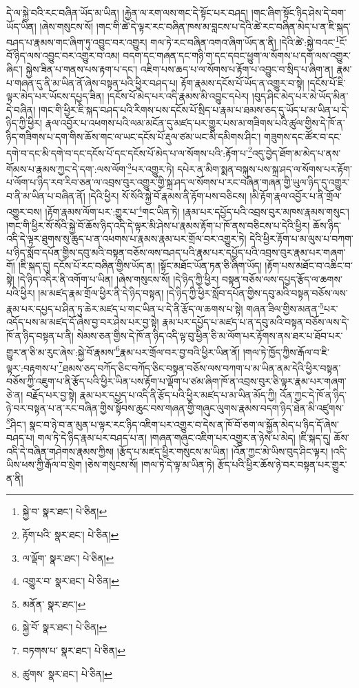 དེ་ལ་སྐྱེ་བའི་རང་བཞིན་ཡོད་མ་ཡིན། །རྐྱེན་ལ་རག་ལས་གང་དེ་སྟོང་པར་བཤད། །གང་ཞིག་སྟོང་ཉིད་ཤེས་དེ་བག་ཡོད་ཡིན། །ཞེས་གསུངས་སོ། །གང་གི་ཚེ་དེ་ལྟར་རང་བཞིན་ཁས་མ་བླངས་པ་དེའི་ཚེ་རང་བཞིན་མེད་པ་ན་ཇི་སྐད་བཤད་པ་རྣམས་གང་ཞིག་ཏུ་འབྱུང་བར་འགྱུར། གལ་ཏེ་རང་བཞིན་འགའ་ཞིག་ཡོད་ན་ནི། །དེའི་ཚེ་:སྐྱེ་བའང་\footnote{སྐྱེ་བ་  སྣར་ཐང་།  པེ་ཅིན། }ངོ་བོ་ཉིད་ལས་འབྱུང་བར་འགྱུར་བ་འམ། བདག་དང་གཞན་དང་གཉི་ག་དང་དབང་ཕྱུག་ལ་སོགས་པ་དག་ལས་འགྱུར་ཞིང་། སྐྱེས་ཟིན་པ་གནས་པས་རྟག་པ་དང་། འཇིག་པས་ཆད་པ་ལ་སོགས་པ་རྟོག་པ་འབྱུང་བ་སྲིད་པ་ཞིག་ན། རྣམ་པ་གཞན་དུ་ནི་མ་ཡིན་ནོ་ཞེས་བསྟན་པའི་ཕྱིར་བཤད་པ། རྟོག་རྣམས་དངོས་པོ་ཡོད་ན་འགྱུར་བ་སྟེ། །དངོས་པོ་ཇི་ལྟར་མེད་པར་ཡོངས་དཔྱད་ཟིན། །དངོས་པོ་མེད་པར་འདི་རྣམས་མི་འབྱུང་དཔེར། །བུད་ཤིང་མེད་པར་མེ་ཡོད་མིན་དེ་བཞིན། །གང་གི་ཕྱིར་ཇི་སྐད་བཤད་པའི་རིགས་པས་དངོས་པོ་སྲིད་པ་རྣམ་པ་ཐམས་ཅད་དུ་ཡོད་པ་མ་ཡིན་པ་དེ་ཉིད་ཀྱི་ཕྱིར། རྣལ་འབྱོར་པ་འཕགས་པའི་ལམ་མངོན་དུ་མཛད་པར་གྱུར་པས་མ་གཟིགས་པའི་ཚུལ་གྱིས་དེ་ཁོ་ན་ཉིད་གཟིགས་པ་དག་གིས་ཆོས་གང་ལ་ཡང་དངོས་པོ་རྡུལ་ཙམ་ཡང་མི་དམིགས་ཤིང་། གཟུགས་དང་ཚོར་བ་དང་དགེ་བ་དང་མི་དགེ་བ་དང་དངོས་པོ་དང་དངོས་པོ་མེད་པ་ལ་སོགས་པའི་:རྟོག་པ་\footnote{རྟོག་པའི་  སྣར་ཐང་།  པེ་ཅིན། }འདུ་བྱེད་ཐོག་མ་མེད་པ་ནས་གོམས་པ་རྣམས་ཀྱང་དེ་དག་:ལས་ལོག་\footnote{ལ་ལྡོག་  སྣར་ཐང་།  པེ་ཅིན། }པར་འགྱུར་ཏེ། དཔེར་ན་མིག་སྨན་བསྐུས་པས་སྐྲ་ཤད་ལ་སོགས་པར་རྟོག་པ་ལོག་པ་ཉིད་རབ་རིབ་ཅན་ལ་འབྲས་བུར་འགྱུར་གྱི་སྐྲ་ཤད་ལ་སོགས་པ་རང་བཞིན་གཞན་གྱི་ཡུལ་ཉིད་དུ་འགྱུར་བ་ནི་མ་ཡིན་པ་བཞིན་ནོ། །དེའི་ཕྱིར། སོ་སོའི་སྐྱེ་བོ་རྣམས་ནི་རྟོག་པས་བཅིངས། །མི་རྟོག་རྣལ་འབྱོར་པ་ནི་གྲོལ་འགྱུར་བས། །རྟོག་རྣམས་ལོག་པར་:གྱུར་པ་\footnote{འགྱུར་བ་  སྣར་ཐང་།  པེ་ཅིན། }གང་ཡིན་ཏེ། །རྣམ་པར་དཔྱོད་པའི་འབྲས་བུར་མཁས་རྣམས་གསུང་། །གང་གི་ཕྱིར་སོ་སོའི་སྐྱེ་བོ་ཆོས་ཉིད་འདི་དེ་ལྟར་མི་ཤེས་པ་རྣམས་རྟོག་པ་ཁོ་ནས་བཅིངས་པ་དེའི་ཕྱིར། ཆོས་ཉིད་འདི་དེ་ལྟར་ཐུགས་སུ་ཆུད་པ་ན་འཕགས་པ་རྣམས་རྣམ་པར་གྲོལ་བར་འགྱུར་ཏེ། དེའི་ཕྱིར་རྟོག་པ་མ་ལུས་པ་བཀག་པ་ཉིད་སློབ་དཔོན་གྱིས་དབུ་མའི་བསྟན་བཅོས་ལས་བཤད་པའི་རྣམ་པར་དཔྱོད་པའི་འབྲས་བུར་རྣམ་པར་གཞག་གོ། །ཇི་སྐད་དུ། དངོས་པོ་རང་བཞིན་གྱིས་ཡོད་ན། །སྟོང་མཐོང་ཡོན་ཏན་ཅི་ཞིག་ཡོད། །རྟོག་པས་མཐོང་བ་འཆིང་བ་སྟེ། །དེ་ཉིད་འདིར་ནི་འགོག་པ་ཡིན། །ཞེས་གསུངས་སོ། །དེ་ཉིད་ཀྱི་ཕྱིར། བསྟན་བཅོས་ལས་དཔྱད་རྩོད་ལ་ཆགས་པའི་ཕྱིར། །མ་མཛད་རྣམ་གྲོལ་ཕྱིར་ནི་དེ་ཉིད་བསྟན། །དེ་ཉིད་ཀྱི་ཕྱིར་སློབ་དཔོན་གྱིས་དབུ་མའི་བསྟན་བཅོས་ལས་རྣམ་པར་དཔྱད་པ་ཤིན་ཏུ་ཆེར་མཛད་པ་གང་ཡིན་པ་དེ་ནི་རྩོད་ལ་ཆགས་པ་སྟེ། གཞན་ཟིལ་གྱིས་མནན་\footnote{མནོན་  སྣར་ཐང་། }པར་འདོད་པས་མ་མཛད་དོ་ཞེས་བྱ་བར་ཤེས་པར་བྱ་སྟེ། རྣམ་པར་དཔྱོད་པ་མཛད་པ་ན་དབུ་མའི་བསྟན་བཅོས་ལས་དེ་ཁོ་ན་ཉིད་བསྟན་པ་ནི། སེམས་ཅན་གྱིས་དེ་ཁོ་ན་ཉིད་འདི་ལྟ་བུ་ཕྱིན་ཅི་མ་ལོག་པར་རྟོགས་ནས་ཐར་པ་ཐོབ་པར་གྱུར་ན་ཅི་མ་རུང་ཞེས་:སྐྱེ་བོ་རྣམས་\footnote{སྐྱེ་བོ་  སྣར་ཐང་།  པེ་ཅིན། }རྣམ་པར་གྲོལ་བར་བྱ་བའི་ཕྱིར་ཡིན་ནོ། །གལ་ཏེ་ཁྱོད་ཀྱིས་རྒོལ་བ་ཇི་ལྟར་:བརྟགས་པ་\footnote{བཏགས་པ་  སྣར་ཐང་།  པེ་ཅིན། }ཐམས་ཅད་བཀོད་ཅིང་བཀོད་ཅིང་བསྟན་བཅོས་ལས་བཀག་པ་མ་ཡིན་ནམ་དེའི་ཕྱིར་བསྟན་བཅོས་ཀྱི་འཇུག་པ་ནི་རྩོད་པའི་ཕྱིར་ཡིན་པས་རྟོག་པ་ལྡོག་པ་ཙམ་ཞིག་ཁོ་ན་འབྲས་བུར་ཅི་ལྟར་རྣམ་པར་གཞག་ཅེ་ན། བརྗོད་པར་བྱ་སྟེ། རྣམ་པར་དཔྱད་པ་འདི་ནི་རྩོད་པའི་ཕྱིར་མཛད་པ་མ་ཡིན་མོད་ཀྱི། འོན་ཀྱང་དེ་ཁོ་ན་ཉིད་ཉེ་བར་བསྟན་པ་ན་རང་བཞིན་གྱིས་སྟོབས་ཆུང་བས་གཞན་གྱི་གཞུང་ལུགས་རྣམས་བདག་ཉིད་ཐེན་མི་འཛུགས་\footnote{ཚུགས་  སྣར་ཐང་།  པེ་ཅིན། }ཤིང་། སྣང་བ་ཉེ་བ་ན་མུན་པ་ལྟར་རང་ཉིད་འཇིག་པར་འགྱུར་བ་དེས་ན་ཁོ་བོ་ཅག་ལ་སྐྱོན་མེད་པ་ཉིད་དོ་ཞེས་བཤད་པ། གལ་ཏེ་དེ་ཉིད་རྣམ་པར་བཤད་པ་ན། །གཞན་གཞུང་འཇིག་པར་འགྱུར་ན་ཉེས་པ་མེད། །ཇི་སྐད་དུ། ཆོས་འདི་དེ་བཞིན་གཤེགས་རྣམས་ཀྱིས། །རྩོད་པ་མཛད་ཕྱིར་གསུངས་མ་ཡིན། །འོན་ཀྱང་མེ་ཡིས་བུད་ཤིང་ལྟར། །འདི་ཡིས་ཕས་ཀྱི་རྒོལ་བ་སྲེག །ཅེས་གསུངས་སོ། །གལ་ཏེ་དེ་ལྟ་མ་ཡིན་ཏེ། རྩོད་པའི་ཕྱིར་ཆོས་ཉེ་བར་བསྟན་པར་གྱུར་ན་ནི། 